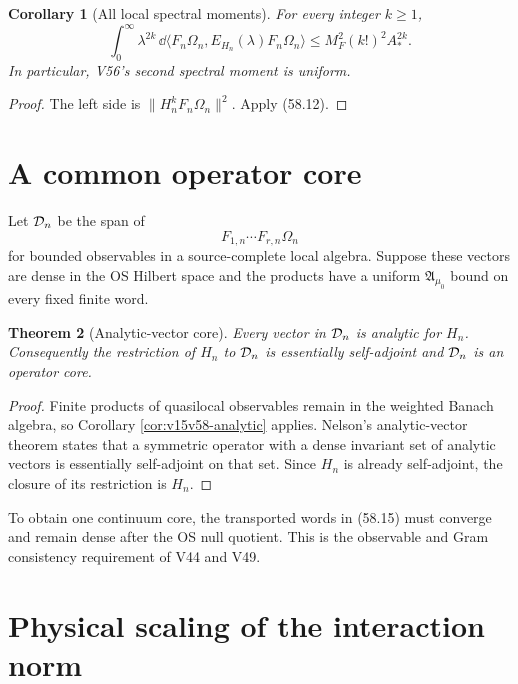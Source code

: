 \documentclass[11pt]{article}
\newtheorem{theorem}{Theorem}[section]
\newtheorem{corollary}[theorem]{Corollary}
\theoremstyle{remark}
\begin{document}
\begin{corollary}[All local spectral moments]
\label{cor:v15v58-moments}
For every integer \(k\geq1\),
\[
 \int_0^\infty\lambda^{2k}\,
 \dd\langle F_n\Omega_n,E_{H_n}(\lambda)F_n\Omega_n\rangle
 \leq M_F^2(k!)^2A_*^{2k}.                              \tag{58.14}
\]
In particular, V56's second spectral moment is uniform.
\end{corollary}

\begin{proof}
The left side is
\(\|H_n^kF_n\Omega_n\|^2\).  Apply (58.12).
\end{proof}

\section{A common operator core}

Let \({\cal D}_n\) be the span of
\[
 F_{1,n}\cdots F_{r,n}\Omega_n                           \tag{58.15}
\]
for bounded observables in a source-complete local algebra.  Suppose
these vectors are dense in the OS Hilbert space and the products
have a uniform \({\mathfrak A}_{\mu_0}\) bound on every fixed
finite word.

\begin{theorem}[Analytic-vector core]
\label{thm:v15v58-core}
Every vector in \({\cal D}_n\) is analytic for \(H_n\).
Consequently the restriction of \(H_n\) to \({\cal D}_n\) is
essentially self-adjoint and \({\cal D}_n\) is an operator core.
\end{theorem}

\begin{proof}
Finite products of quasilocal observables remain in the weighted
Banach algebra, so Corollary \ref{cor:v15v58-analytic} applies.
Nelson's analytic-vector theorem states that a symmetric operator
with a dense invariant set of analytic vectors is essentially
self-adjoint on that set.  Since \(H_n\) is already self-adjoint,
the closure of its restriction is \(H_n\).
\end{proof}

To obtain one continuum core, the transported words in (58.15) must
converge and remain dense after the OS null quotient.  This is the
observable and Gram consistency requirement of V44 and V49.

\section{Physical scaling of the interaction norm}
\end{document}
